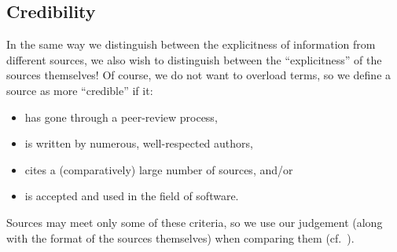 \subsection{Credibility}\label{cred}

In the same way we distinguish between the explicitness of information from
different sources, we also wish to distinguish between the ``explicitness'' of the
sources themselves! Of course, we do not want to overload terms, so we define a
source as more ``credible'' if it:
\begin{itemize}
    \item has gone through a peer-review process,
    \item is written by numerous, well-respected authors,
    \item cites a (comparatively) large number of sources, and/or
    \item is accepted and used in the field of software.
\end{itemize}
Sources may meet only some of these criteria, so we use our judgement (along
with the format of the sources themselves) when comparing them
(cf.~).
